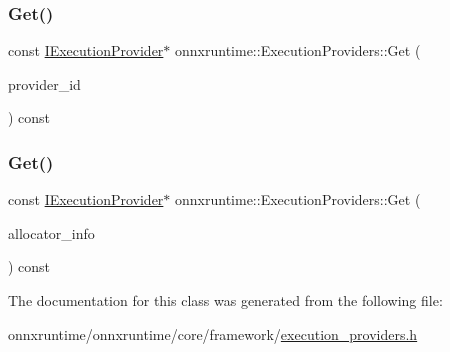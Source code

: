 \mbox{\label{classonnxruntime_1_1ExecutionProviders_a9545ef8343f02280aa5871579576c8ba}} 
\subsubsection{\texorpdfstring{Get()}{Get()}\hspace{0.1cm}{\footnotesize\ttfamily [2/3]}}
{\footnotesize\ttfamily const \mbox{\hyperlink{classonnxruntime_1_1IExecutionProvider}{I\+Execution\+Provider}}$\ast$ onnxruntime\+::\+Execution\+Providers\+::\+Get (\begin{DoxyParamCaption}\item[{\mbox{\hyperlink{namespaceonnxruntime_a863e2227cbf32aab76aad35fdadff4bb}{onnxruntime\+::\+Provider\+Type}}}]{provider\+\_\+id }\end{DoxyParamCaption}) const\hspace{0.3cm}{\ttfamily [inline]}}

\mbox{\label{classonnxruntime_1_1ExecutionProviders_a65c0368906fb2431bffe5a81fb5ea5b2}} 
\subsubsection{\texorpdfstring{Get()}{Get()}\hspace{0.1cm}{\footnotesize\ttfamily [3/3]}}
{\footnotesize\ttfamily const \mbox{\hyperlink{classonnxruntime_1_1IExecutionProvider}{I\+Execution\+Provider}}$\ast$ onnxruntime\+::\+Execution\+Providers\+::\+Get (\begin{DoxyParamCaption}\item[{const \mbox{\hyperlink{structONNXRuntimeAllocatorInfo}{O\+N\+N\+X\+Runtime\+Allocator\+Info}} \&}]{allocator\+\_\+info }\end{DoxyParamCaption}) const\hspace{0.3cm}{\ttfamily [inline]}}



The documentation for this class was generated from the following file\+:\begin{DoxyCompactItemize}
\item 
onnxruntime/onnxruntime/core/framework/\mbox{\hyperlink{execution__providers_8h}{execution\+\_\+providers.\+h}}\end{DoxyCompactItemize}
